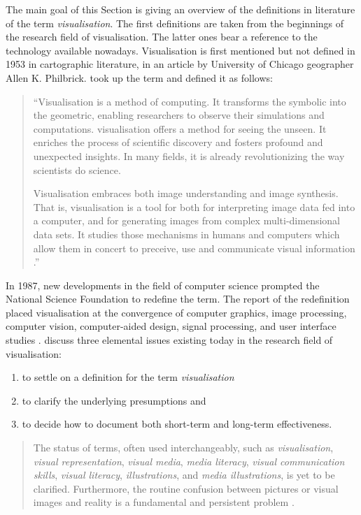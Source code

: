 \cbstart
The main goal of this Section is giving an overview of the definitions in literature of the term \textit{visualisation}. The first definitions are taken from the beginnings of the research field of visualisation. The latter ones bear a reference to the technology available nowadays.
\cbend
Visualisation is first mentioned but not defined in 1953 in cartographic literature, in an article by University of Chicago geographer Allen K. Philbrick. \citeauthor{mccormick:1987} took up the term and defined it as follows:
\begin{quote}
 ``Visualisation is a method of computing. It transforms the symbolic into the geometric, enabling researchers to observe their simulations and computations. visualisation offers a method for seeing the unseen. It enriches the process of scientific discovery and fosters profound and unexpected insights. In many fields, it is already revolutionizing the way scientists do science.

 Visualisation embraces both image understanding and image synthesis. That is, visualisation is a tool for both for interpreting image data fed into a computer, and for generating images from complex multi-dimensional data sets. It studies those mechanisms in humans and computers which allow them in concert to preceive, use and communicate visual information .''
\end{quote}

In 1987, new developments in the field of computer science prompted the National Science Foundation to redefine the term. The report of the redefinition placed visualisation at the convergence of computer graphics, image processing, computer vision, computer-aided design, signal processing, and user interface studies . \citeauthor{Phillips2010} discuss three elemental issues existing today in the research field of visualisation:

\begin{enumerate}
\item to settle on a definition for the term \textit{visualisation}
\item to clarify the underlying presumptions and
\item to decide how to document both short-term and long-term effectiveness.
\end{enumerate}

\begin{quote}
The status of terms, often used interchangeably, such as \textit{visualisation}, \textit{visual representation}, \textit{visual media}, \textit{media literacy}, \textit{visual communication skills}, \textit{visual literacy}, \textit{illustrations}, and \textit{media illustrations}, is yet to be clarified. Furthermore, the routine confusion between pictures or visual images and reality is a fundamental and persistent problem .
\end{quote}

